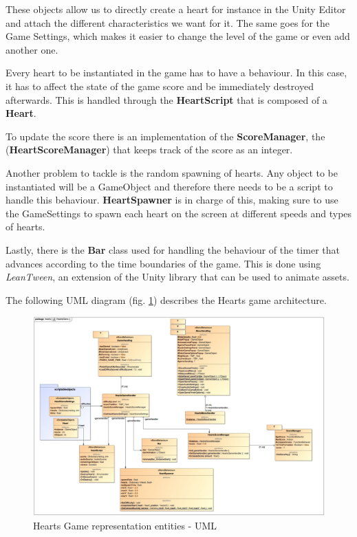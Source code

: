 These objects allow us to directly create a heart for instance in the Unity Editor and attach the different characteristics we want for it. The same goes for the Game Settings, which makes it easier to change the level of the game or even add another one.

Every heart to be instantiated in the game has to have a behaviour. In this case, it has to affect the state of the game score and be immediately destroyed afterwards. This is handled through the \textbf{HeartScript} that is composed of a \textbf{Heart}.

To update the score there is an implementation of the 
\textbf{ScoreManager}, the (\textbf{HeartScoreManager}) that keeps track of the score as an integer.

Another problem to tackle is the random spawning of hearts. Any object to be instantiated will be a GameObject and therefore there needs to be a script to handle this behaviour. \textbf{HeartSpawner} is in charge of this, making sure to use the GameSettings to spawn each heart on the screen at different speeds and types of hearts.

Lastly, there is the \textbf{Bar} class used for handling the behaviour of the timer that advances according to the time boundaries of the game. This is done using \textit{LeanTween}, an extension of the Unity library that can be used to animate assets.

The following UML diagram (fig. \ref{fig:heartsGameArq}) describes the Hearts game architecture.

\begin{figure}[H]
    \centering
    \includegraphics[scale=0.3]{Chapters/arq/new/HeartsGame.jpg}
    \caption{Hearts Game representation entities - UML}
    \label{fig:heartsGameArq}
\end{figure}

